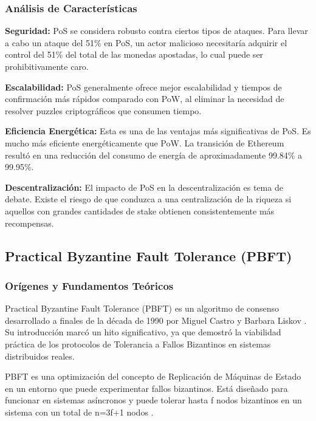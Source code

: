 \documentclass[spanish,12pt,letterpaper]{report}
\begin{document}
\subsubsection{Análisis de Características}

\textbf{Seguridad:} PoS se considera robusto contra ciertos tipos de ataques. Para llevar a cabo un ataque del 51\% en PoS, un actor malicioso necesitaría adquirir el control del 51\% del total de las monedas apostadas, lo cual puede ser prohibitivamente caro.

\textbf{Escalabilidad:} PoS generalmente ofrece mejor escalabilidad y tiempos de confirmación más rápidos comparado con PoW, al eliminar la necesidad de resolver puzzles criptográficos que consumen tiempo.

\textbf{Eficiencia Energética:} Esta es una de las ventajas más significativas de PoS. Es mucho más eficiente energéticamente que PoW. La transición de Ethereum resultó en una reducción del consumo de energía de aproximadamente 99.84\% a 99.95\%.

\textbf{Descentralización:} El impacto de PoS en la descentralización es tema de debate. Existe el riesgo de que conduzca a una centralización de la riqueza si aquellos con grandes cantidades de stake obtienen consistentemente más recompensas.

\subsection{Practical Byzantine Fault Tolerance (PBFT)}

\subsubsection{Orígenes y Fundamentos Teóricos}

Practical Byzantine Fault Tolerance (PBFT) es un algoritmo de consenso desarrollado a finales de la década de 1990 por Miguel Castro y Barbara Liskov \parencite{castro1999practical}. Su introducción marcó un hito significativo, ya que demostró la viabilidad práctica de los protocolos de Tolerancia a Fallos Bizantinos en sistemas distribuidos reales.

PBFT es una optimización del concepto de Replicación de Máquinas de Estado en un entorno que puede experimentar fallos bizantinos. Está diseñado para funcionar en sistemas asíncronos y puede tolerar hasta f nodos bizantinos en un sistema con un total de n=3f+1 nodos \parencite{geeksforgeeks2024pbft}.
\end{document}
